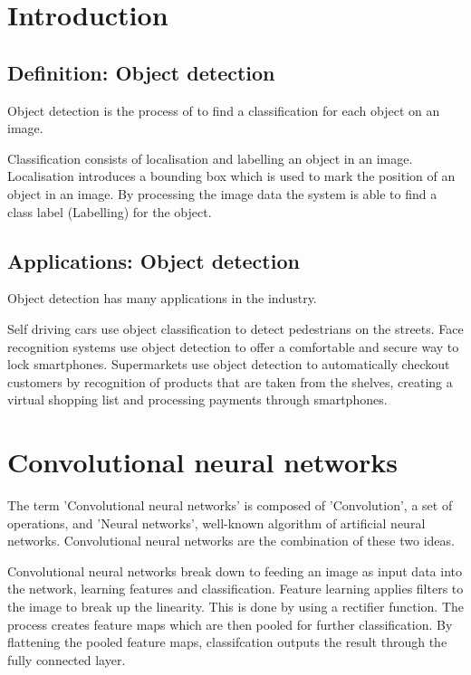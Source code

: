 \documentclass[a4paper,13pt,twoside]{book}
\begin{document}
\chapter{Introduction}

\section{Definition: Object detection}
Object detection is the process of to find a classification for each object on an image.

Classification consists of localisation and labelling an object in an image.
Localisation introduces a bounding box which is used to mark the position of an object in an image.
By processing the image data the system is able to find a class label (Labelling) for the object.

\section{Applications: Object detection}

Object detection has many applications in the industry.

Self driving cars use object classification to detect pedestrians on the streets.
Face recognition systems use object detection to offer a comfortable and secure way to lock smartphones.
Supermarkets use object detection to automatically checkout customers by recognition of products that are taken from the shelves, creating a virtual shopping list and processing payments through smartphones.

\chapter{Convolutional neural networks}

The term 'Convolutional neural networks' is composed of 'Convolution', a set of operations, and 'Neural networks', well-known algorithm of artificial neural networks. Convolutional neural networks are the combination of these two ideas.

Convolutional neural networks break down to feeding an image as input data into the network, learning features and classification. Feature learning applies filters to the image to break up the linearity. This is done by using a rectifier function. The process creates feature maps which are then pooled for further classification. By flattening the pooled feature maps, classifcation outputs the result through the fully connected layer.
\end{document}

